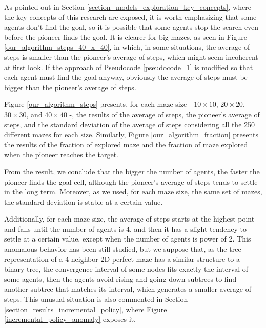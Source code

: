 As pointed out in Section \ref{section_models_exploration_key_concepts}, where the key concepts of this research are exposed, it is worth emphasizing that some agents don't find the goal, so it is possible that some agents stop the search even before the pioneer finds the goal. It is clearer for big mazes, as seen in Figure \ref{our_algorithm_steps_40_x_40}, in which, in some situations, the average of steps is smaller than the pioneer's average of steps, which might seem incoherent at first look. If the approach of Pseudocode \ref{pseudocode_1} is modified so that each agent must find the goal anyway, obviously the average of steps must be bigger than the pioneer's average of steps.

Figure \ref{our_algorithm_steps} presents, for each maze size - $10 \times 10$, $20 \times 20$, $30 \times 30$, and $40 \times 40$ -, the results of the average of steps, the pioneer's average of steps, and the standard deviation of the average of steps considering all the 250 different mazes for each size. Similarly, Figure \ref{our_algorithm_fraction} presents the results of the fraction of explored maze and the fraction of maze explored when the pioneer reaches the target.

From the result, we conclude that the bigger the number of agents, the faster the pioneer finds the goal cell, although the pioneer's average of steps tends to settle in the long term. Moreover, as we used, for each maze size, the same set of mazes, the standard deviation is stable at a certain value. 

Additionally, for each maze size, the average of steps starts at the highest point and falls until the number of agents is 4, and then it has a slight tendency to settle at a certain value, except when the number of agents is power of 2. This anomalous behavior has been still studied, but we suppose that, as the tree representation of a 4-neighbor 2D perfect maze has a similar structure to a binary tree, the convergence interval of some nodes fits exactly the interval of some agents, then the agents avoid rising and going down subtrees to find another subtree that matches its interval, which generates a smaller average of steps. This unusual situation is also commented in Section \ref{section_results_incremental_policy}, where Figure \ref{incremental_policy_anomaly} exposes it.

